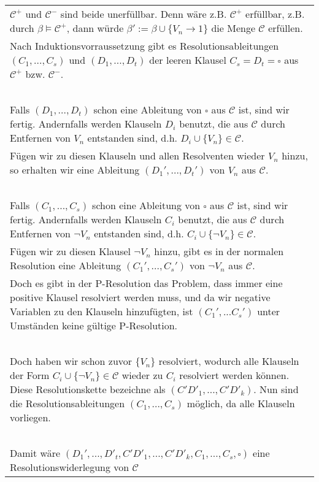 \documentclass[a4paper,10pt]{article}
\newcommand{\tabspace}{15cm}
\begin{document}
\begin{itemize}
		\begin{tabular}{@{} p{\tabspace}}
		$\mathcal{C}^+$ und $\mathcal{C}^-$ sind beide unerfüllbar. Denn wäre z.B. $\mathcal{C}^+$ erfüllbar, z.B. durch $\beta \vDash \mathcal{C}^+$, dann würde $\beta' := \beta \cup \{V_n \rightarrow 1 \}$ die Menge $\mathcal{C}$ erfüllen. \\
		Nach Induktionsvorraussetzung gibt es Resolutionsableitungen $(C_1,...,C_s)$ und $(D_1,...,D_t)$ der leeren Klausel $C_s = D_t = \square$ aus $\mathcal{C}^+$ bzw. $\mathcal{C}^-$. \\
		 \ \\
		Falls  $(D_1,...,D_t)$  schon eine Ableitung von $\square$ aus $\mathcal{C}$ ist, sind wir fertig. Andernfalls werden Klauseln $D_i$ benutzt, die aus $\mathcal{C}$ durch Entfernen von $V_n$ entstanden sind, d.h. $D_i \cup \{V_n \} \in \mathcal{C}$. \\
		Fügen wir zu diesen Klauseln und allen Resolventen wieder $V_n$ hinzu, so erhalten wir eine Ableitung $(D_1',...,D_t')$ von $V_n$ aus $\mathcal{C}$. \\
		 \ \\
		 Falls $(C_1,..., C_s)$ schon eine Ableitung von $\square$ aus $\mathcal{C}$ ist, sind wir fertig. Andernfalls werden Klauseln $C_i$ benutzt, die aus $\mathcal{C}$ durch Entfernen von $\lnot V_n$ entstanden sind, d.h. $C_i \cup \{\lnot V_n \} \in \mathcal{C}$. \\
		Fügen wir zu diesen Klausel $\lnot V_n$ hinzu, gibt es in der normalen Resolution eine Ableitung $(C_1',...,C_s')$ von $\lnot V_n$ aus $\mathcal{C}$. 
		\ \\Doch es gibt in der P-Resolution das Problem, dass immer eine positive Klausel resolviert werden muss, und da wir negative Variablen zu den Klauseln hinzufügten, ist $(C_1',...C_s')$ unter Umständen keine gültige P-Resolution. \\
		\ \\
		Doch haben wir schon zuvor $\{V_n \}$ resolviert, wodurch alle Klauseln der Form $C_i \cup \{\lnot V_n \} \in \mathcal{C}$ wieder zu $C_i$ resolviert werden können. Diese Resolutionskette bezeichne als $(C'D'_1,...,C'D'_k)$. Nun sind die Resolutionsableitungen $(C_1,..., C_s)$ möglich, da alle Klauseln vorliegen. \\
		\ \\
		Damit wäre $(D_1',...,D'_t,C'D'_1,...,C'D'_k,C_1,...,C_s,\square)$ eine Resolutionswiderlegung von $\mathcal{C}$ 
	\end{tabular}
\end{itemize}
\end{document}
